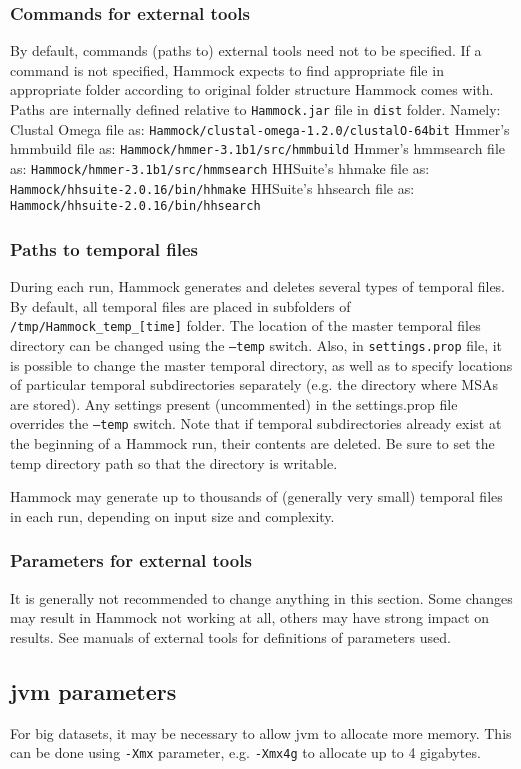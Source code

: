 \documentclass[11pt, a4paper, twoside, titlepage]{article}
\begin{document}
\subsubsection{Commands for external tools}
By default, commands (paths to) external tools need not to be specified. If a command is not specified, Hammock expects to find appropriate file in appropriate folder according to original folder structure Hammock comes with. Paths are internally defined relative to \texttt{Hammock.jar} file in \texttt{dist} folder. Namely: \newline\newline
Clustal Omega file as: \texttt{Hammock/clustal-omega-1.2.0/clustalO-64bit}\newline
Hmmer's hmmbuild file as: \texttt{Hammock/hmmer-3.1b1/src/hmmbuild}\newline
Hmmer's hmmsearch file as: \texttt{Hammock/hmmer-3.1b1/src/hmmsearch}\newline
HHSuite's hhmake file as: \texttt{Hammock/hhsuite-2.0.16/bin/hhmake}\newline
HHSuite's hhsearch file as: \texttt{Hammock/hhsuite-2.0.16/bin/hhsearch}\newline

\subsubsection{Paths to temporal files}
During each run, Hammock generates and deletes several types of temporal files. By default, all temporal files are placed in subfolders of \texttt{/tmp/Hammock\_temp\_[time]} folder. The location of the master temporal files directory can be changed using the \texttt{--temp} switch. Also, in \texttt{settings.prop} file, it is possible to change the master temporal directory, as well as to specify locations of particular temporal subdirectories separately (e.g. the directory where MSAs are stored). Any settings present (uncommented) in the settings.prop file overrides the \texttt{--temp} switch. Note that if temporal subdirectories already exist at the beginning of a Hammock run, their contents are deleted. Be sure to set the temp directory path so that the directory is writable.

 Hammock may generate up to thousands of (generally very small) temporal files in each run, depending on input size and complexity.

\subsubsection{Parameters for external tools}
It is generally not recommended to change anything in this section. Some changes may result in Hammock not working at all, others may have strong impact on results. See manuals of external tools for definitions of parameters used.

\subsection{jvm parameters}
For big datasets, it may be necessary to allow jvm to allocate more memory. This can be done using \texttt{-Xmx} parameter, e.g. \texttt{-Xmx4g} to allocate up to 4 gigabytes. 





{}
\end{document}
